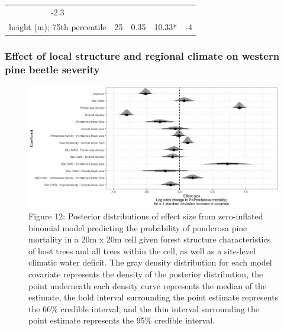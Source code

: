 \documentclass[]{article}
\begin{document}
\begin{longtable}[]{@{}ccccc@{}}
\begin{minipage}[t]{0.13\columnwidth}
-2.3\strut
\end{minipage}\tabularnewline
\begin{minipage}[t]{0.28\columnwidth}\centering\strut
height (m); 75th percentile\strut
\end{minipage} & \begin{minipage}[t]{0.13\columnwidth}\centering\strut
25\strut
\end{minipage} & \begin{minipage}[t]{0.24\columnwidth}\centering\strut
0.35\strut
\end{minipage} & \begin{minipage}[t]{0.08\columnwidth}\centering\strut
10.33*\strut
\end{minipage} & \begin{minipage}[t]{0.13\columnwidth}\centering\strut
-4\strut
\end{minipage}\tabularnewline
\bottomrule
\end{longtable}

\subsubsection{Effect of local structure and regional climate on western
pine beetle
severity}\label{effect-of-local-structure-and-regional-climate-on-western-pine-beetle-severity}

\begin{figure}
\centering
\includegraphics{../../figures/effect-sizes-halfeye.png}
\caption{Figure 12: Posterior distributions of effect size from
zero-inflated binomial model predicting the probability of ponderosa
pine mortality in a 20m x 20m cell given forest structure
characteristics of host trees and all trees within the cell, as well as
a site-level climatic water deficit. The gray density distribution for
each model covariate represents the density of the posterior
distribution, the point underneath each density curve represents the
median of the estimate, the bold interval surrounding the point estimate
represents the 66\% credible interval, and the thin interval surrounding
the point estimate represents the 95\% credible interval.}
\end{figure}
\end{document}
